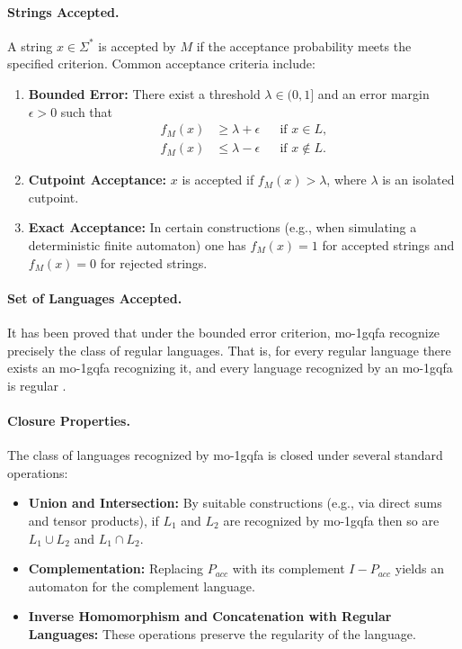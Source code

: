 \paragraph{Strings Accepted.}  
A string $x\in\Sigma^*$ is accepted by $M$ if the acceptance probability meets the specified criterion. Common acceptance criteria include:
\begin{enumerate}
  \item \textbf{Bounded Error:} There exist a threshold $\lambda\in(0,1]$ and an error margin $\epsilon>0$ such that
  \[
  \begin{aligned}
  f_M(x) &\ge \lambda+\epsilon &&\text{if } x\in L,\\[1mm]
  f_M(x) &\le \lambda-\epsilon &&\text{if } x\notin L.
  \end{aligned}
  \]
  \item \textbf{Cutpoint Acceptance:} $x$ is accepted if $f_M(x)>\lambda$, where $\lambda$ is an isolated cutpoint.
  \item \textbf{Exact Acceptance:} In certain constructions (e.g., when simulating a deterministic finite automaton) one has $f_M(x)=1$ for accepted strings and $f_M(x)=0$ for rejected strings.
\end{enumerate}

\paragraph{Set of Languages Accepted.}  
It has been proved that under the bounded error criterion, \gls{mo-1gqfa} recognize precisely the class of regular languages. That is, for every regular language there exists an \gls{mo-1gqfa} recognizing it, and every language recognized by an \gls{mo-1gqfa} is regular \cite{LI201273}.

\paragraph{Closure Properties.}  
The class of languages recognized by \gls{mo-1gqfa} is closed under several standard operations:
\begin{itemize}
  \item \textbf{Union and Intersection:} By suitable constructions (e.g., via direct sums and tensor products), if $L_1$ and $L_2$ are recognized by \gls{mo-1gqfa} then so are $L_1\cup L_2$ and $L_1\cap L_2$.
  \item \textbf{Complementation:} Replacing $P_{acc}$ with its complement $I-P_{acc}$ yields an automaton for the complement language.
  \item \textbf{Inverse Homomorphism and Concatenation with Regular Languages:} These operations preserve the regularity of the language.
\end{itemize}

